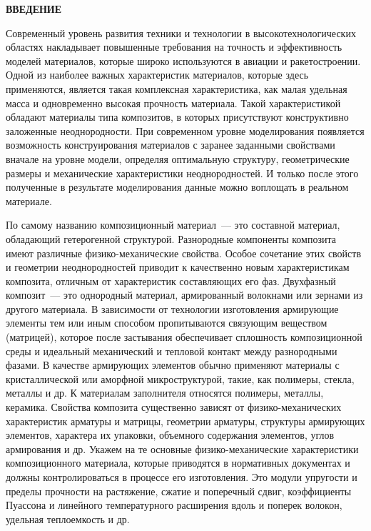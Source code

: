 
\begin{center}
{\normalsize\textbf{\centering ВВЕДЕНИЕ}}\vspace{14pt}
\end{center}


Современный уровень развития техники и технологии в высокотехнологических областях накладывает повышенные требования на точность и эффективность моделей материалов, которые широко используются в авиации и ракетостроении. Одной из наиболее важных характеристик материалов, которые здесь применяются, является такая комплексная характеристика, как малая удельная масса и одновременно высокая прочность материала. Такой характеристикой обладают материалы типа композитов, в которых присутствуют конструктивно заложенные неоднородности. При современном уровне моделирования появляется возможность конструирования материалов с заранее заданными свойствами вначале на уровне модели, определяя оптимальную структуру, геометрические размеры и механические характеристики неоднородностей. И только после этого полученные в результате моделирования данные можно воплощать в реальном материале.

По самому названию композиционный материал~--- это составной материал, обладающий гетерогенной структурой. Разнородные компоненты композита имеют различные физико-механические свойства. Особое сочетание этих свойств и геометрии неоднородностей приводит к качественно новым характеристикам композита, отличным от характеристик составляющих его фаз. Двухфазный композит~--- это однородный материал, армированный волокнами или зернами из другого материала. В зависимости от технологии изготовления армирующие элементы тем или иным способом пропитываются связующим веществом (матрицей), которое после застывания обеспечивает сплошность композиционной среды и идеальный механический и тепловой контакт между разнородными фазами. В качестве армирующих элементов обычно применяют материалы с кристаллической или аморфной микроструктурой, такие, как полимеры, стекла, металлы и др. К материалам заполнителя относятся полимеры, металлы, керамика. Свойства композита существенно зависят от физико-механических характеристик арматуры и матрицы, геометрии арматуры, структуры армирующих элементов, характера их упаковки, объемного содержания элементов, углов армирования и др. Укажем на те основные физико-механические характеристики композиционного материала, которые приводятся в нормативных документах и должны контролироваться в процессе его изготовления. Это модули упругости и пределы прочности на растяжение, сжатие и поперечный сдвиг, коэффициенты Пуассона и линейного температурного расширения вдоль и поперек волокон, удельная теплоемкость и др.{\sloppy\par}


